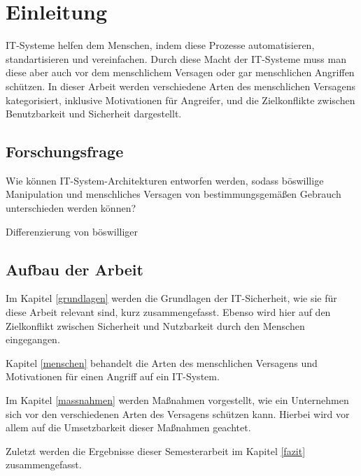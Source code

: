 \newpage
\section{Einleitung} \label{Einleitung}
IT-Systeme helfen dem Menschen, indem diese Prozesse automatisieren,
standartisieren und vereinfachen. Durch diese Macht der IT-Systeme muss man
diese aber auch vor dem menschlichem Versagen oder gar menschlichen Angriffen
schützen.
In dieser Arbeit werden verschiedene Arten des menschlichen Versagens
kategorisiert, inklusive Motivationen für Angreifer, und die Zielkonflikte
zwischen Benutzbarkeit und Sicherheit dargestellt.


\subsection{Forschungsfrage}
Wie können IT-System-Architekturen entworfen werden, sodass böswillige
Manipulation und menschliches Versagen von bestimmungsgemäßen Gebrauch unterschieden
werden können?

Differenzierung von böswilliger 


\subsection{Aufbau der Arbeit}
Im Kapitel \ref{grundlagen} werden die Grundlagen der IT-Sicherheit, wie sie für diese
Arbeit relevant sind, kurz zusammengefasst. Ebenso wird hier auf den
Zielkonflikt zwischen Sicherheit und Nutzbarkeit durch den Menschen eingegangen.

Kapitel \ref{menschen} behandelt die Arten des menschlichen Versagens und Motivationen
für einen Angriff auf ein IT-System.

Im Kapitel \ref{massnahmen} werden Maßnahmen vorgestellt, wie ein Unternehmen sich vor den
verschiedenen Arten des Versagens schützen kann. Hierbei wird vor allem auf die
Umsetzbarkeit dieser Maßnahmen geachtet.

Zuletzt werden die Ergebnisse dieser Semesterarbeit im Kapitel \ref{fazit}
zusammengefasst.
